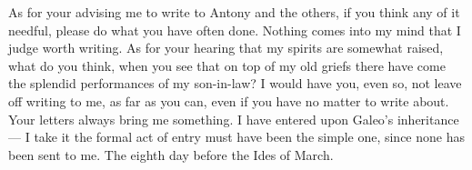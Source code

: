  As for your advising me to write to Antony and the others, if you think any of it needful, please do what you have often done. Nothing comes into my mind that I judge worth writing. As for your hearing that my spirits are somewhat raised, what do you think, when you see that on top of my old griefs there have come the splendid performances of my son-in-law? I would have you, even so, not leave off writing to me, as far as you can, even if you have no matter to write about. Your letters always bring me something. I have entered upon Galeo's inheritance --- I take it the formal act of entry must have been the simple one, since none has been sent to me. The eighth day before the Ides of March.

